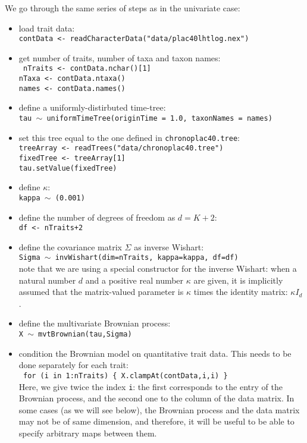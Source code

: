 \documentclass[usletter]{article}
\newcommand{\cmd}[1]{\texttt{#1}}
\begin{document}
We go through the same series of steps as in the univariate case:
\begin{itemize}
\item
load trait data:
\\
\cmd{contData <- readCharacterData("data/plac40lhtlog.nex")}
\item
get number of traits, number of taxa and taxon names:
\\
\cmd{
nTraits <- contData.nchar()[1]
\\
nTaxa <- contData.ntaxa()
\\
names <- contData.names()
}
\item
define a uniformly-distirbuted time-tree:
\\
\cmd{tau $\sim$ uniformTimeTree(originTime = 1.0, taxonNames = names)}
\item
set this tree equal to the one defined in \cmd{chronoplac40.tree}:
\\
\cmd{treeArray <- readTrees("data/chronoplac40.tree")
\\
fixedTree <- treeArray[1]
\\
tau.setValue(fixedTree)}
\item
define $\kappa$:
\\
\cmd{kappa $\sim$ (0.001)}
\item
define the number of degrees of freedom as $d = K+2$:
\\
\cmd{df <- nTraits+2}
\item
define the covariance matrix $\Sigma$ as inverse Wishart:
\\
\cmd{Sigma $\sim$ invWishart(dim=nTraits, kappa=kappa, df=df)}
\\
note that we are using a special constructor for the inverse Wishart: when a natural number $d$ and a positive real number $\kappa$ are given, it is implicitly assumed that the matrix-valued parameter is $\kappa$ times the identity matrix: $\kappa I_d$.
\item
define the multivariate Brownian process:
\\
\cmd{X $\sim$ mvtBrownian(tau,Sigma)}
\item
condition the Brownian model on quantitative trait data.
This needs to be done separately for each trait:
\\
\cmd{
for (i in 1:nTraits)    \{
        X.clampAt(contData,i,i)
\}
}
\\
Here, we give twice the index \cmd{i}: the first corresponds to the entry of the Brownian process, and the second one to the column of the data matrix. In some cases (as we will see below), the Brownian process and the data matrix may not be of same dimension, and therefore, it will be useful to be able to specify arbitrary maps between them.
\end{itemize}
\end{document}
